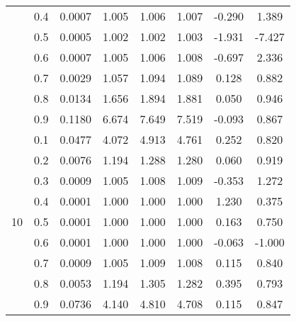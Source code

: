 \documentclass[11pt,a4paper]{report}
\begin{document}
\begin{longtable}{ | c | c || c | c | c | c | c | c | }
 & 0.4 & 0.0007 & 1.005 & 1.006 & 1.007 & -0.290 & 1.389 \\
 & 0.5 & 0.0005 & 1.002 & 1.002 & 1.003 & -1.931 & -7.427 \\
 & 0.6 & 0.0007 & 1.005 & 1.006 & 1.008 & -0.697 & 2.336 \\
 & 0.7 & 0.0029 & 1.057 & 1.094 & 1.089 & 0.128 & 0.882 \\
 & 0.8 & 0.0134 & 1.656 & 1.894 & 1.881 & 0.050 & 0.946 \\
 & 0.9 & 0.1180 & 6.674 & 7.649 & 7.519 & -0.093 & 0.867 \\
 \hline
\multirow{9}{*}{10} & 0.1 & 0.0477 & 4.072 & 4.913 & 4.761 & 0.252 & 0.820 \\
 & 0.2 & 0.0076 & 1.194 & 1.288 & 1.280 & 0.060 & 0.919 \\
 & 0.3 & 0.0009 & 1.005 & 1.008 & 1.009 & -0.353 & 1.272 \\
 & 0.4 & 0.0001 & 1.000 & 1.000 & 1.000 & 1.230 & 0.375 \\
 & 0.5 & 0.0001 & 1.000 & 1.000 & 1.000 & 0.163 & 0.750 \\
 & 0.6 & 0.0001 & 1.000 & 1.000 & 1.000 & -0.063 & -1.000 \\
 & 0.7 & 0.0009 & 1.005 & 1.009 & 1.008 & 0.115 & 0.840 \\
 & 0.8 & 0.0053 & 1.194 & 1.305 & 1.282 & 0.395 & 0.793 \\
 & 0.9 & 0.0736 & 4.140 & 4.810 & 4.708 & 0.115 & 0.847 \\
 \hline
\hline
\end{longtable}
\end{document}

